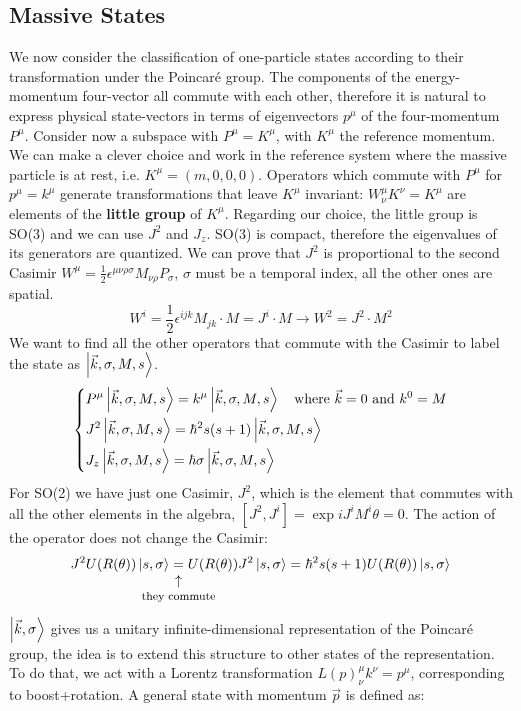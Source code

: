 \documentclass[../main.tex]{subfiles}
\begin{document}
\subsection{Massive States}
We now consider the classification of one-particle states according to their transformation under the Poincaré group. The components of the energy-momentum four-vector all commute with each other, therefore it is natural to express physical state-vectors in terms of eigenvectors $p^\mu$ of the four-momentum $P^\mu$. Consider now a subspace with $P^\mu=K^\mu$, with $K^\mu$ the reference momentum. We can make a clever choice and work in the reference system where the massive particle is at rest, i.e. $K^\mu=(m,0,0,0)$. Operators which commute with $P^\mu$ for $p^\mu=k^\mu$ generate transformations that leave $K^\mu$ invariant: $W^\mu_\nu K^\nu=K^\mu$ are elements of the \textbf{little group} of $K^\mu$. Regarding our choice, the little group is SO(3) and we can use $J^2$ and $J_z$. SO(3) is compact, therefore the eigenvalues of its generators are quantized. We can prove that $J^2$ is proportional to the second Casimir $W^\mu=\frac{1}{2}\epsilon^{\mu\nu\rho\sigma}M_{\nu\rho}P_\sigma$, $\sigma$ must be a temporal index, all the other ones are spatial.
\[
W^i=\frac{1}{2}\epsilon^{ijk}M_{jk}\cdot M=J^i\cdot M\xrightarrow[]{}W^2=J^2\cdot M^2
\]
We want to find all the other operators that commute with the Casimir to label the state as $\ket{\Vec{k},\sigma,M,s}$.
\[
\left\{
\begin{aligned}
&P^\mu\ket{\Vec{k},\sigma,M,s}=k^\mu\ket{\Vec{k},\sigma,M,s} \quad \text{where $\Vec{k}=0$ and $k^0=M$}\\
&J^2\ket{\Vec{k},\sigma,M,s}=\hbar^2s(s+1)\ket{\Vec{k},\sigma,M,s}\\
&J_z\ket{\Vec{k},\sigma,M,s}=\hbar\sigma\ket{\Vec{k},\sigma,M,s}
\end{aligned}
\right.
\]
For SO(2) we have just one Casimir, $J^2$, which is the element that commutes with all the other elements in the algebra, $[J^2,J^i]=\exp{iJ^iM^i\theta}=0$. The action of the operator does not change the Casimir:
\[
J^2U(R(\theta))\ket{s,\sigma}\underset{\mathclap{\tikz \node {$\uparrow$} node [below=1ex] {\footnotesize they commute };}}{=}U(R(\theta))J^2\ket{s,\sigma}=\hbar^2s(s+1)U(R(\theta))\ket{s,\sigma}
\]
$\ket{\Vec{k},\sigma}$ gives us a unitary infinite-dimensional representation of the Poincaré group, the idea is to extend this structure to other states of the representation. To do that, we act with a Lorentz transformation $L(p)^\mu_\nu k^\nu=p^\mu$, corresponding to boost+rotation. A general state with momentum $\Vec{p}$ is defined as:
\end{document}
